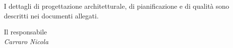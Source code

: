 I dettagli di progettazione architetturale, di pianificazione e di qualità sono descritti nei documenti allegati.\\

\begin{flushright}
	Il responsabile\\
	\textit{Carraro Nicola}
\end{flushright}